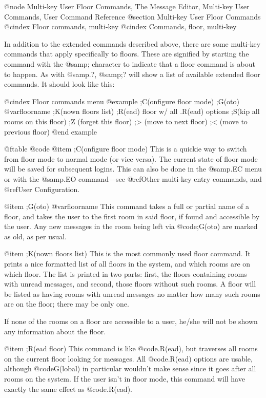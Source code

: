 @node Multi-key User Floor Commands, The Message Editor, Multi-key User Commands, User Command Reference
@section Multi-key User Floor Commands
@cindex Floor commands, multi-key
@cindex Commands, floor, multi-key

In addition to the extended commands described above, there are some
multi-key commands that apply specifically to floors.  These are signified
by starting the command with the @samp{;} character to indicate that a
floor command is about to happen.  As with @samp{.?}, @samp{;?} will show a
list of available extended floor commands.  It should look like this:

@cindex Floor commands menu
@example
;C(onfigure floor mode)
;G(oto) @var{floorname}
;K(nown floors list)
;R(ead) floor w/ all .R(ead) options
;S(kip all rooms on this floor)
;Z (forget this floor)
;> (move to next floor)
;< (move to previous floor)
@end example

@ftable @code
@item ;C(onfigure floor mode)
This is a quickie way to switch from floor mode to normal
mode (or vice versa).  The current state of floor mode will be saved
for subsequent logins.  This can also be done in the @samp{.EC} menu
or with the @samp{.EO} command---see @ref{Other multi-key entry commands},
and @ref{User Configuration}.

@item ;G(oto) @var{floorname}
This command takes a full or partial name of a floor, and
takes the user to the first room in said floor, if found and accessible
by the user.  Any new messages
in the room being left via @code{;G(oto)} are marked as old, as per usual.

@item ;K(nown floors list)
This is the most commonly used floor command.  It prints a
nice formatted list of all floors in the system, and which rooms are
on which floor.  The list is printed in two parts: first, the floors
containing rooms with unread messages, and second, those floors without
such rooms.  A floor will be listed as having rooms with unread
messages no matter how many such rooms are on the floor; there may be
only one.

If none of the rooms on a floor are accessible to a user,
he/she will not be shown any information about the floor.

@item ;R(ead floor)
This command is like @code{.R(ead)}, but traverses all rooms on the
current floor looking for messages.  All @code{.R(ead)} options are usable,
although @code{G(lobal)} in particular wouldn't make sense since it goes after
all rooms on the system.  If the user isn't in floor mode, this
command will have exactly the same effect as @code{.R(ead)}.

